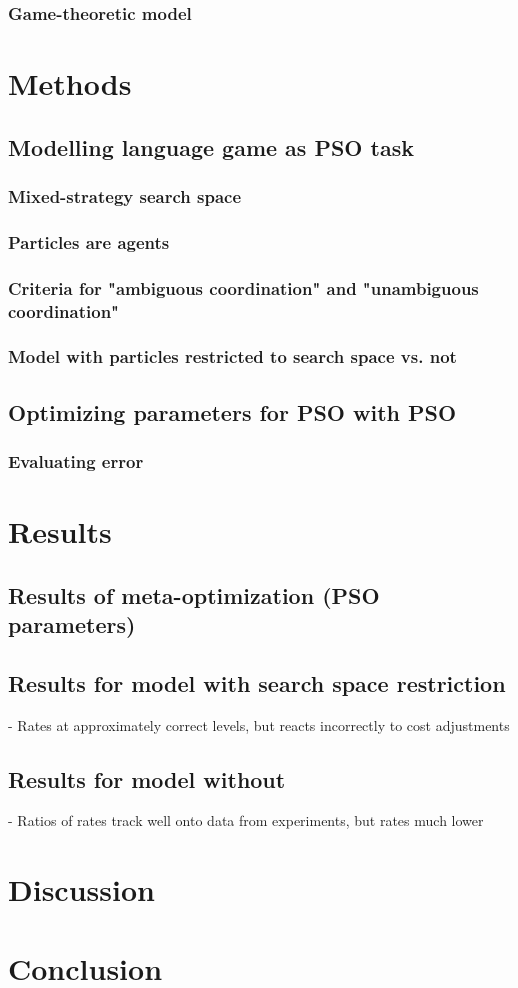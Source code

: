 \documentclass[12pt]{article}
\begin{document}
\subsubsection{Game-theoretic model}


\section{Methods}
\subsection{Modelling language game as PSO task}
\subsubsection{Mixed-strategy search space}
\subsubsection{Particles are agents}
\subsubsection{Criteria for "ambiguous coordination" and "unambiguous coordination"}
\subsubsection{Model with particles restricted to search space vs. not}

\subsection{Optimizing parameters for PSO with PSO}
\subsubsection{Evaluating error}

\section{Results}
\subsection{Results of meta-optimization (PSO parameters)}
\subsection{Results for model with search space restriction}
- Rates at approximately correct levels, but reacts incorrectly to cost adjustments
\subsection{Results for model without}
- Ratios of rates track well onto data from experiments, but rates much lower


\section{Discussion}



\section{Conclusion}
\end{document}

